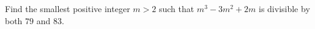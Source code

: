 Find the smallest positive integer $m>2$ such that $m^3-3m^2+2m$ is divisible by both $79$ and $83$.
